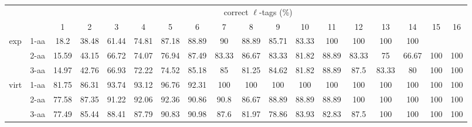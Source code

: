 \documentclass{article}[12pt]
\begin{document}
\begin{landscape}
\begin{table}[h]\tiny
\vspace{3mm}
{\centering
\begin{center}
\begin{tabular}{|c|l|c|c|c|c|c|c|c|c|c|c|c|c|c|c|c|c|}
  \hline
  \multicolumn{2}{|c|}{ } & \multicolumn{ 16 }{|c|}{ correct $\ell$-tags (\%)} \\
  \cline{3- 18}
  \multicolumn{2}{|c|}{ }  & 1 & 2 & 3 & 4 & 5 & 6 & 7 & 8 & 9 & 10 & 11 & 12 & 13 & 14 & 15 & 16\\
  \hline
  \multirow{3}{*}{exp}
&  1-aa  & 18.2 & 38.48 & 61.44 & 74.81 & 87.18 & 88.89 & 90 & 88.89 & 85.71 & 83.33 & 100 & 100 & 100 & 100 &  & \\
&  2-aa  & 15.59 & 43.15 & 66.72 & 74.07 & 76.94 & 87.49 & 83.33 & 86.67 & 83.33 & 81.82 & 88.89 & 83.33 & 75 & 66.67 & 100 & 100\\
&  3-aa  & 14.97 & 42.76 & 66.93 & 72.22 & 74.52 & 85.18 & 85 & 81.25 & 84.62 & 81.82 & 88.89 & 87.5 & 83.33 & 80 & 100 & 100\\
 \hline
  \multirow{3}{*}{virt} 
&  1-aa  & 81.75 & 86.31 & 93.74 & 93.12 & 96.76 & 92.31 & 100 & 100 & 100 & 100 & 100 & 100 & 100 & 100 & 100 & 100\\
&  2-aa  & 77.58 & 87.35 & 91.22 & 92.06 & 92.36 & 90.86 & 90.8 & 86.67 & 88.89 & 88.89 & 88.89 & 100 & 100 & 100 & 100 & 100\\
&  3-aa  & 77.49 & 85.44 & 88.41 & 87.79 & 90.83 & 90.98 & 87.6 & 81.97 & 78.86 & 83.93 & 82.83 & 87.5 & 100 & 100 & 100 & 100\\
 \hline
\end{tabular}
\end{center}
\par}
\centering
\vspace{3mm}
\end{table}


\end{landscape}
\end{document}
